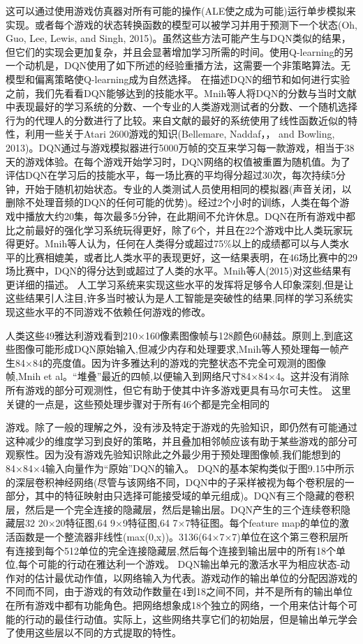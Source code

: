 这可以通过使用游戏仿真器对所有可能的操作(ALE使之成为可能)运行单步模拟来实现。或者每个游戏的状态转换函数的模型可以被学习并用于预测下一个状态(Oh, Guo, Lee, Lewis, and Singh, 2015)。虽然这些方法可能产生与DQN类似的结果，但它们的实现会更加复杂，并且会显著增加学习所需的时间。使用Q-learning的另一个动机是，DQN使用了如下所述的经验重播方法，这需要一个非策略算法。无模型和偏离策略使Q-learning成为自然选择。
在描述DQN的细节和如何进行实验之前，我们先看看DQN能够达到的技能水平。Mnih等人将DQN的分数与当时文献中表现最好的学习系统的分数、一个专业的人类游戏测试者的分数、一个随机选择行为的代理人的分数进行了比较。来自文献的最好的系统使用了线性函数近似的特性，利用一些关于Atari 2600游戏的知识(Bellemare, Naddaf，， and Bowling, 2013)。DQN通过与游戏模拟器进行5000万帧的交互来学习每一款游戏，相当于38天的游戏体验。在每个游戏开始学习时，DQN网络的权值被重置为随机值。为了评估DQN在学习后的技能水平，每一场比赛的平均得分超过30次，每次持续5分钟，开始于随机初始状态。专业的人类测试人员使用相同的模拟器(声音关闭，以删除不处理音频的DQN的任何可能的优势)。经过2个小时的训练，人类在每个游戏中播放大约20集，每次最多5分钟，在此期间不允许休息。DQN在所有游戏中都比之前最好的强化学习系统玩得更好，除了6个，并且在22个游戏中比人类玩家玩得更好。Mnih等人认为，任何在人类得分或超过75\%以上的成绩都可以与人类水平的比赛相媲美，或者比人类水平的表现更好，这一结果表明，在46场比赛中的29场比赛中，DQN的得分达到或超过了人类的水平。Mnih等人(2015)对这些结果有更详细的描述。
人工学习系统来实现这些水平的发挥将足够令人印象深刻,但是让这些结果引人注目,许多当时被认为是人工智能是突破性的结果,同样的学习系统实现这些水平的不同游戏不依赖任何游戏的修改。

人类这些49雅达利游戏看到210×160像素图像帧与128颜色60赫兹。原则上,到底这些图像可能形成DQN原始输入,但减少内存和处理要求,Mnih等人预处理每一帧产生84×84的亮度值。因为许多雅达利的游戏的完整状态不完全可观测的图像帧,Mnih et al。“堆叠”最近的四帧,以便输入到网络尺寸84×84×4。这并没有消除所有游戏的部分可观测性，但它有助于使其中许多游戏更具有马尔可夫性。
这里关键的一点是，这些预处理步骤对于所有46个都是完全相同的

游戏。除了一般的理解之外，没有涉及特定于游戏的先验知识，即仍然有可能通过这种减少的维度学习到良好的策略，并且叠加相邻帧应该有助于某些游戏的部分可观察性。因为没有游戏先验知识除此之外最少用于预处理图像帧,我们能想到的84×84×4输入向量作为“原始”DQN的输入。
DQN的基本架构类似于图9.15中所示的深层卷积神经网络(尽管与该网络不同，DQN中的子采样被视为每个卷积层的一部分，其中的特征映射由只选择可能接受域的单元组成)。DQN有三个隐藏的卷积层，然后是一个完全连接的隐藏层，然后是输出层。DQN产生的三个连续卷积隐藏层32 20×20特征图,64 9×9特征图,64 7×7特征图。每个feature map的单位的激活函数是一个整流器非线性(max(0,x))。3136(64×7×7)单位在这个第三卷积层所有连接到每个512单位的完全连接隐藏层,然后每个连接到输出层中的所有18个单位,每个可能的行动在雅达利一个游戏。
DQN输出单元的激活水平为相应状态-动作对的估计最优动作值，以网络输入为代表。游戏动作的输出单位的分配因游戏的不同而不同，由于游戏的有效动作数量在4到18之间不同，并不是所有的输出单位在所有游戏中都有功能角色。把网络想象成18个独立的网络，一个用来估计每个可能的行动的最佳行动值。实际上，这些网络共享它们的初始层，但是输出单元学会了使用这些层以不同的方式提取的特性。

